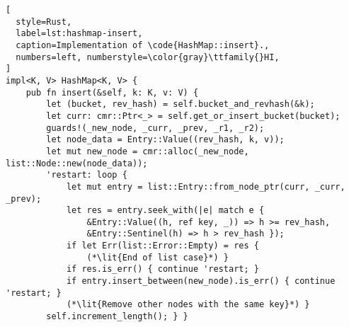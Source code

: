 \begin{lstlisting}[
  style=Rust,
  label=lst:hashmap-insert,
  caption=Implementation of \code{HashMap::insert}.,
  numbers=left, numberstyle=\color{gray}\ttfamily{}HI,
]
impl<K, V> HashMap<K, V> {
    pub fn insert(&self, k: K, v: V) {
        let (bucket, rev_hash) = self.bucket_and_revhash(&k);
        let curr: cmr::Ptr<_> = self.get_or_insert_bucket(bucket);
        guards!(_new_node, _curr, _prev, _r1, _r2);
        let node_data = Entry::Value((rev_hash, k, v));
        let mut new_node = cmr::alloc(_new_node, list::Node::new(node_data));
        'restart: loop {
            let mut entry = list::Entry::from_node_ptr(curr, _curr, _prev);
            let res = entry.seek_with(|e| match e {
                &Entry::Value((h, ref key, _)) => h >= rev_hash,
                &Entry::Sentinel(h) => h > rev_hash });
            if let Err(list::Error::Empty) = res {
                (*\lit{End of list case}*) }
            if res.is_err() { continue 'restart; }
            if entry.insert_between(new_node).is_err() { continue 'restart; }
            (*\lit{Remove other nodes with the same key}*) }
        self.increment_length(); } }
\end{lstlisting}
